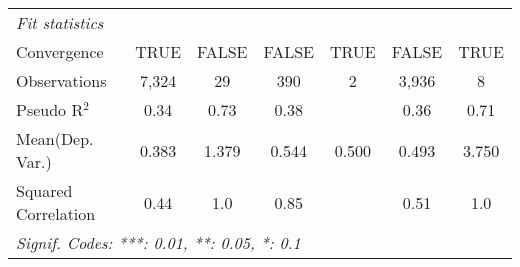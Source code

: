 \begin{tabular}{lcccccc}
   \midrule
   \emph{Fit statistics}\\
   Convergence                                                &TRUE        & FALSE        & FALSE         & TRUE & FALSE   & TRUE\\  
   Observations                                               & 7,324      & 29           & 390           & 2    & 3,936   & 8\\  
   Pseudo R$^2$                                               & 0.34       & 0.73         & 0.38          &      & 0.36    & 0.71\\  
Mean(Dep. Var.) & 0.383 & 1.379 & 0.544 & 0.500 & 0.493 & 3.750 \\
   Squared Correlation                                        & 0.44       & 1.0          & 0.85          &      & 0.51    & 1.0\\  
   \midrule \midrule
   \multicolumn{7}{l}{\emph{Signif. Codes: ***: 0.01, **: 0.05, *: 0.1}}\\
\end{tabular}
\par\endgroup
